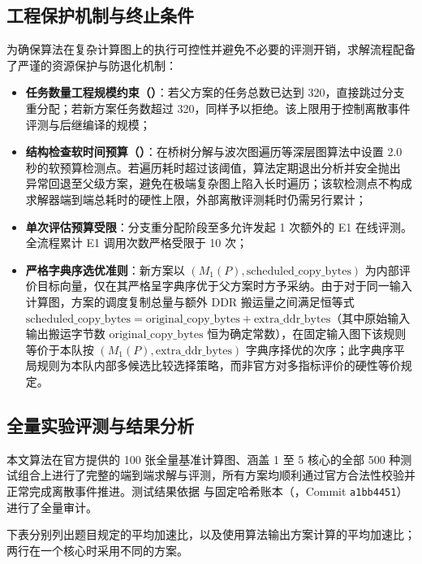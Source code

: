 \documentclass[anonymous,notoc]{gmcm2026}
\providecommand{\tightlist}{\setlength{\itemsep}{0pt}\setlength{\parskip}{0pt}}
\begin{document}
\subsection{工程保护机制与终止条件}

为确保算法在复杂计算图上的执行可控性并避免不必要的评测开销，求解流程配备了严谨的资源保护与防退化机制：

\begin{itemize}
\tightlist
\item
  \textbf{任务数量工程规模约束（\texttt{}）}：若父方案的任务总数已达到 320，直接跳过分支重分配；若新方案任务数超过 320，同样予以拒绝。该上限用于控制离散事件评测与后继编译的规模；
\item
  \textbf{结构检查软时间预算（\texttt{}）}：在桥树分解与波次图遍历等深层图算法中设置 2.0 秒的软预算检测点。若遍历耗时超过该阈值，算法定期退出分析并安全抛出 \texttt{} 异常回退至父级方案，避免在极端复杂图上陷入长时遍历；该软检测点不构成求解器端到端总耗时的硬性上限，外部离散评测耗时仍需另行累计；
\item
  \textbf{单次评估预算受限}：分支重分配阶段至多允许发起 1 次额外的 E1 在线评测。全流程累计 E1 调用次数严格受限于 10 次；
\item
  \textbf{严格字典序选优准则}：新方案以 \((M_1(P), \text{scheduled\_copy\_bytes})\) 为内部评价目标向量，仅在其严格呈字典序优于父方案时方予采纳。由于对于同一输入计算图，方案的调度复制总量与额外 DDR 搬运量之间满足恒等式 \(\text{scheduled\_copy\_bytes} = \text{original\_copy\_bytes} + \text{extra\_ddr\_bytes}\)（其中原始输入输出搬运字节数 \(\text{original\_copy\_bytes}\) 恒为确定常数），在固定输入图下该规则等价于本队按 \((M_1(P), \text{extra\_ddr\_bytes})\) 字典序择优的次序；此字典序平局规则为本队内部多候选比较选择策略，而非官方对多指标评价的硬性等价规定。
\end{itemize}

\subsection{全量实验评测与结果分析}

本文算法在官方提供的 100 张全量基准计算图、涵盖 1 至 5 核心的全部 500 种测试组合上进行了完整的端到端求解与评测，所有方案均顺利通过官方合法性校验并正常完成离散事件推进。测试结果依据 \texttt{} 与固定哈希账本（\texttt{}，Commit \texttt{a1bb4451}）进行了全量审计。

下表分别列出题目规定的平均加速比，以及使用算法输出方案计算的平均加速比；两行在一个核心时采用不同的方案。
\end{document}

